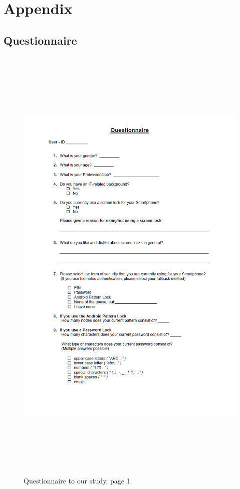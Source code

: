 

\chapter{Appendix}\label{ch:appendix} 

\section{Questionnaire}
\begin{figure}[H]
\includegraphics[width=15cm, height=22cm]{Chapters/graphics/survey1.PNG}
\caption{Questionnaire to our study, page 1.}
\end{figure}

